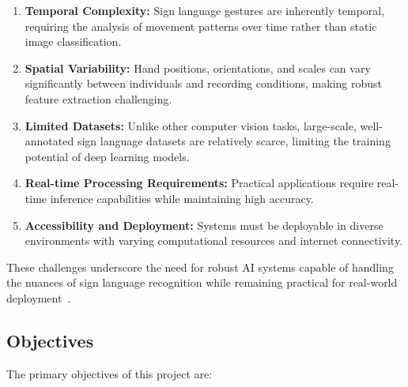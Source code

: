 \documentclass[11pt, a4paper]{article}
\begin{document}
\begin{enumerate}
    \item \textbf{Temporal Complexity:} Sign language gestures are inherently temporal, requiring the analysis of movement patterns over time rather than static image classification.
    
    \item \textbf{Spatial Variability:} Hand positions, orientations, and scales can vary significantly between individuals and recording conditions, making robust feature extraction challenging.
    
    \item \textbf{Limited Datasets:} Unlike other computer vision tasks, large-scale, well-annotated sign language datasets are relatively scarce, limiting the training potential of deep learning models.
    
    \item \textbf{Real-time Processing Requirements:} Practical applications require real-time inference capabilities while maintaining high accuracy.
    
    \item \textbf{Accessibility and Deployment:} Systems must be deployable in diverse environments with varying computational resources and internet connectivity.
\end{enumerate}

These challenges underscore the need for robust AI systems capable of handling the nuances of sign language recognition while remaining practical for real-world deployment~\cite{Koller20}.

\subsection{Objectives}

The primary objectives of this project are:
\end{document}
